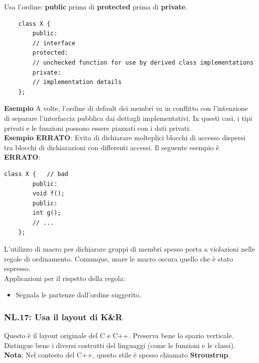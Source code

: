 \textsf{\small Usa l'ordine: \textbf{public} prima di \textbf{protected} prima di \textbf{private}. } \\

\begin{lstlisting}
	class X {
		public:
		// interface
		protected:
		// unchecked function for use by derived class implementations
		private:
		// implementation details
	};
\end{lstlisting}

\textsf{\small \textbf{Esempio} A volte, l'ordine di default dei membri va in conflitto con l'intenzione di separare l'interfaccia pubblica dai dettagli implementativi. In questi casi, i tipi privati e le funzioni possono essere piazzati con i dati privati.} \\

\textsf{\small \textbf{Esempio ERRATO}: Evita di dichiarare molteplici blocchi di accesso dispersi tra blocchi di dichiarazioni con differenti accessi. Il seguente esempio è \textbf{\color{red}ERRATO}\normalcolor: } \\

\begin{lstlisting}[frame=single, rulecolor=\color{red}]
	class X {   // bad
		public:
		void f();
		public:
		int g();
		// ...
	};
\end{lstlisting}

\textsf{\small L'utilizzo di macro per dichiarare gruppi di membri spesso porta a violazioni nelle regole di ordinamento. Comunque, usare le macro oscura quello che è stato espresso. } \\

\textsf{\small Applicazioni per il rispetto della regola: } 

\begin{itemize}
	\item \textsf{\small Segnala le partenze dall'ordine suggerito.}
\end{itemize}

\subsubsection{NL.17: Usa il layout di K\&R }

\textsf{\small Questo è il layout originale del C e C++. Preserva bene lo spazio verticale. Distingue bene i diversi costrutti del linguaggi (come le funzioni e le classi).} \\

\textsf{\small \textbf{Nota}: Nel contesto del C++, questo stile è spesso chiamato \textbf{Stroustrup}.} \\

